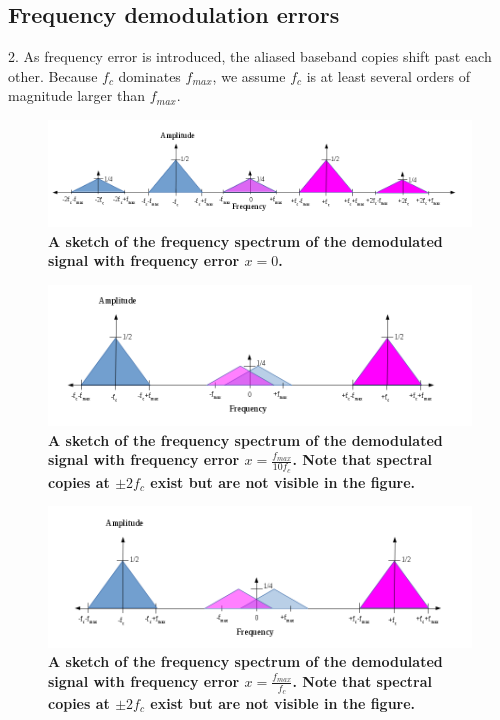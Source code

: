 \documentclass[letterpaper,12pt]{article}
\begin{document}
\subsection*{Frequency demodulation errors}

2. As frequency error is introduced, the aliased baseband copies shift past each
other.  Because $f_{c}$ dominates $f_{max}$, we assume $f_{c}$ is at least
several orders of magnitude larger than $f_{max}$.

\begin{figure}[hbtp]
\includegraphics[width=1.0\columnwidth]{prelab1-figure2a}
\caption{
\label{fig:prelab1-figure2a}
{\bf A sketch of the frequency spectrum of the demodulated signal with
frequency error $x=0$.
}
}
\end{figure}

\begin{figure}[hbtp]
\includegraphics[width=1.0\columnwidth]{prelab1-figure2b}
\caption{
\label{fig:prelab1-figure2b}
{\bf A sketch of the frequency spectrum of the demodulated signal with
frequency error $x=\frac{f_{max}}{10f_{c}}$. Note that spectral copies at
$\pm2f_{c}$ exist but are not visible in the figure.
}
}
\end{figure}

\begin{figure}[hbtp]
\includegraphics[width=1.0\columnwidth]{prelab1-figure2c}
\caption{
\label{fig:prelab1-figure2c}
{\bf  A sketch of the frequency spectrum of the demodulated signal with
frequency error $x=\frac{f_{max}}{f_{c}}$.  Note that spectral copies at
$\pm2f_{c}$ exist but are not visible in the figure.
}
}
\end{figure}
\end{document}
